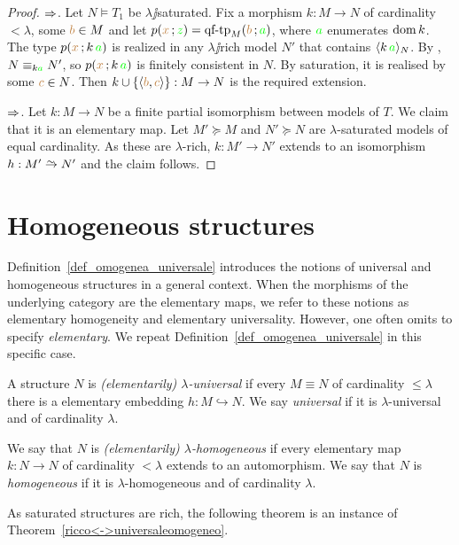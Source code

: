 \documentclass[creche.tex]{subfiles}
\begin{document}
\begin{proof}$\Rightarrow$. Let $N\models T_1$ be $\lambda\jj$saturated. Fix a morphism $k:M\to N$ of cardinality $<\lambda$, some ${\color{brown} b}\in M$ and let $p({\color{brown} x}\,;{\color{green} z})=\textrm{qf\mbox{-}tp}_M({\color{brown} b}\,;{\color{green} a})$, where ${\color{green} a}$ enumerates $\mathop{\rm dom} k$. The type $p({\color{brown} x}\,;k\,{\color{green} a})$ is realized in any $\lambda\jj$rich model $N'$ that contains $\langle k\,{\color{green} a}\rangle_N$. By , $N\equiv_{k{\color{green} a}} N'$, so $p({\color{brown} x}\,;k\,{\color{green} a})$ is finitely consistent in $N$.  By saturation, it is realised by some ${\color{brown} c}\in N$. Then $k\cup \{\langle{\color{brown}b},{\color{brown} c}\rangle\}:M\to N$ is the required extension.


$\Rightarrow$. Let $k:M\to N$ be a finite partial isomorphism between models of $T$. We claim that it is an elementary map. Let $M'\succeq M$ and $N'\succeq N$ are $\lambda$-saturated models of equal cardinality. As these are $\lambda$-rich, $k:M'\to N'$ extends to an isomorphism $h:M'\isomap N'$ and the claim follows.
\end{proof}


\section{Homogeneous structures}\label{homogeneous}
Definition~\ref{def_omogenea_universale} introduces the notions of universal and homogeneous structures in a general context. When the morphisms of the underlying category are the elementary maps, we refer to these notions as elementary homogeneity and elementary universality. However, one often omits to specify \textit{elementary}. We repeat Definition~\ref{def_omogenea_universale} in this specific case. 

\begin{definition}
A structure $N$ is \emph{(elementarily) $\lambda$-universal\/} if every $M\equiv N$ of cardinality $\le\lambda$ there is a elementary embedding $h:M\hookrightarrow N$. We say  \emph{universal\/}  if it is $\lambda$-universal and of cardinality $\lambda$.

We say that $N$ is \emph{(elementarily) $\lambda$-homogeneous\/} if every elementary map $k:N\to N$ of cardinality $<\lambda$ extends to an automorphism. We say that $N$ is \emph{homogeneous\/} if it is $\lambda$-homogeneous and of cardinality $\lambda$.\QED
\end{definition}

As saturated structures are rich, the following theorem is an instance of Theorem~\ref{ricco<->universaleomogeneo}.
\end{document}

